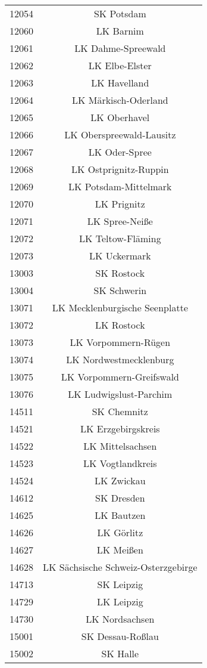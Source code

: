 \begin{tabular}{c c}
    12054&SK Potsdam\\ 
    12060&LK Barnim\\ 
    12061&LK Dahme-Spreewald\\ 
    12062&LK Elbe-Elster\\ 
    12063&LK Havelland\\ 
    12064&LK Märkisch-Oderland\\ 
    12065&LK Oberhavel\\ 
    12066&LK Oberspreewald-Lausitz\\ 
    12067&LK Oder-Spree\\ 
    12068&LK Ostprignitz-Ruppin\\ 
    12069&LK Potsdam-Mittelmark\\ 
    12070&LK Prignitz\\ 
    12071&LK Spree-Neiße\\ 
    12072&LK Teltow-Fläming\\ 
    12073&LK Uckermark\\ 
    13003&SK Rostock\\ 
    13004&SK Schwerin\\ 
    13071&LK Mecklenburgische Seenplatte\\ 
    13072&LK Rostock\\ 
    13073&LK Vorpommern-Rügen\\ 
    13074&LK Nordwestmecklenburg\\ 
    13075&LK Vorpommern-Greifswald\\ 
    13076&LK Ludwigslust-Parchim\\ 
    14511&SK Chemnitz\\ 
    14521&LK Erzgebirgskreis\\ 
    14522&LK Mittelsachsen\\ 
    14523&LK Vogtlandkreis\\ 
    14524&LK Zwickau\\ 
    14612&SK Dresden\\ 
    14625&LK Bautzen\\ 
    14626&LK Görlitz\\ 
    14627&LK Meißen\\ 
    14628&LK Sächsische Schweiz-Osterzgebirge\\ 
    14713&SK Leipzig\\ 
    14729&LK Leipzig\\ 
    14730&LK Nordsachsen\\ 
    15001&SK Dessau-Roßlau\\ 
    15002&SK Halle\\ 

\end{tabular}
